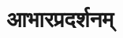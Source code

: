 %
%
%

\renewcommand\chaptername{}
\chapter[आभारप्रदर्शनम्]{आभारप्रदर्शनम्}
\fontsize{14}{21}\selectfont
